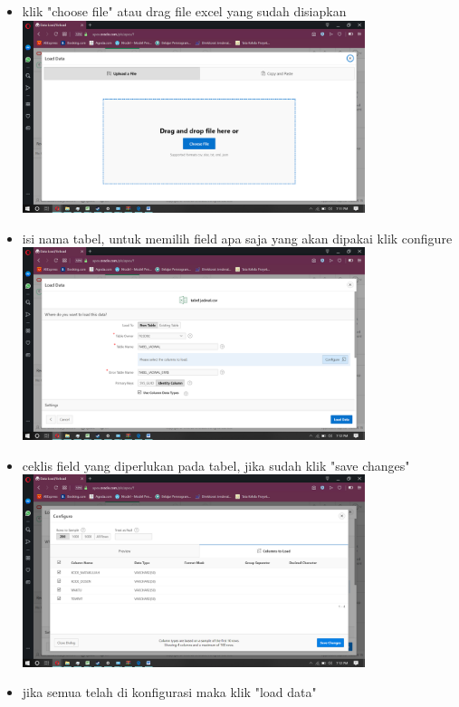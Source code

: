 \documentclass[a4paper,12pt]{report}
\begin{document}
\begin{itemize}
	\item klik "choose file" atau drag file excel yang sudah disiapkan\\
	\includegraphics[width=10cm]{excel to db tabel/Screenshot (141).png}\\ 
	\item isi nama tabel, untuk memilih field apa saja yang akan dipakai klik configure\\
	\includegraphics[width=10cm]{excel to db tabel/Screenshot (142).png}\\ 
	\item ceklis field yang diperlukan pada tabel, jika sudah klik "save changes"\\
	\includegraphics[width=10cm]{excel to db tabel/Screenshot (144).png}\\ 
	\item jika semua telah di konfigurasi maka klik "load data"\\
	


\end{itemize}
\end{document}
